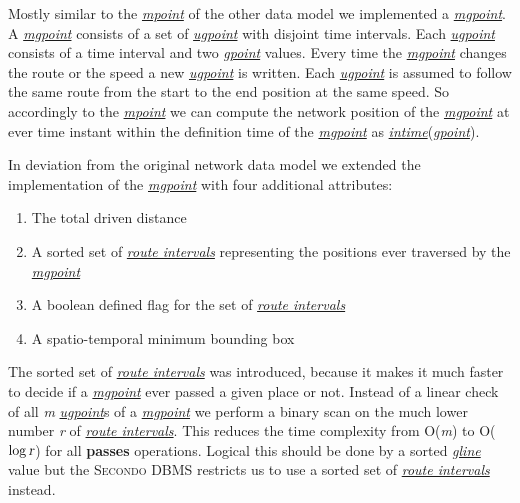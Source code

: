 \documentclass[a4paper]{article}
\newcommand{\secondo}{\textsc{Secondo}}
\newcommand{\op}[1]{\textbf{#1}}
\newcommand{\var}[1]{\textsl{#1}}
\newcommand{\dt}[1]{\textsl{\underline{#1}}}
\begin{document}
{Mostly similar to the \dt{mpoint} of the other data model we implemented a \dt{mgpoint}. A \dt{mgpoint} consists of a set of \dt{ugpoint} with disjoint time intervals. Each \dt{ugpoint} consists of a time interval and two \dt{gpoint} values. Every time the \dt{mgpoint} changes the route or the speed a new \dt{ugpoint} is written. Each \dt{ugpoint} is assumed to follow the same route from the start to the end position at the same speed. So accordingly to the \dt{mpoint} we can compute the network position of the \dt{mgpoint} at ever time instant within the definition time of the \dt{mgpoint} as \dt{intime}(\dt{gpoint}).

In deviation from the original network data model we extended the implementation of the \dt{mgpoint} with four additional attributes:
\begin{enumerate}
	\item The total driven distance
	\item A sorted set of \dt{route intervals} representing the positions ever traversed by the \dt{mgpoint}
	\item A boolean defined flag for the set of \dt{route intervals}
	\item A spatio-temporal minimum bounding box
\end{enumerate}
The sorted set of \dt{route intervals} was introduced, because it makes it much faster to decide if a \dt{mgpoint} ever passed a given place or not. Instead of a linear check of all \var{m} \dt{ugpoint}s of a \dt{mgpoint} we perform a binary scan on the much lower number \var{r} of \dt{route intervals}. This reduces the time complexity from O(\var{m}) to O($\log \var{r}$) for all \op{passes} operations. Logical this should be done by a sorted \dt{gline} value but the \secondo{} DBMS restricts us to use a sorted set of \dt{route intervals} instead.

}
\end{document}
